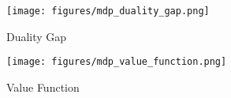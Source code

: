 \documentclass[12pt]{article}
\begin{document}







\begin{figure}[ht]
\vskip -0.1in
\begin{center}
\centerline{\texttt{[image: figures/mdp\_duality\_gap.png]}}
\vskip -0.15in
\caption{Duality Gap}
\label{fig:mdp-duality-gap}
\end{center}
\vskip -0.3in
\end{figure}
\begin{figure}[ht]
\vskip -0.1in
\begin{center}
\centerline{\texttt{[image: figures/mdp\_value\_function.png]}}
\vskip -0.15in
\caption{Value Function}
\label{fig:mdp-value-function}
\end{center}
\vskip -0.3in
\end{figure}
\end{document}
